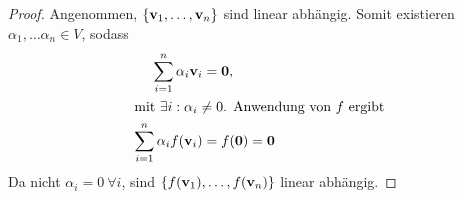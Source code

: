\documentclass{../mfa}
\begin{document}
\subsection{}

\begin{proof}
   Angenommen, $\{\mathbf{v}_{1}, \ldots, \mathbf{v}_{n}\}$ sind linear abhängig. Somit existieren
   $\alpha_1, \ldots \alpha_n \in V$, sodass
   \begin{align*}
      \sum_{i=1}^n \alpha_i \mathbf{v}_{i} &= \mathbf{0},\\
      \intertext{mit $\exists i : \alpha_i \neq 0$. Anwendung von $f$ ergibt}
      \sum_{i=1}^n \alpha_i f(\mathbf{v}_{i}) &= f(\mathbf{0}) = \mathbf{0}\\
   \end{align*}
   Da nicht $\alpha_i = 0 ~\forall i$, sind $\{f(\mathbf{v}_{1}), \ldots, f(\mathbf{v}_{n})\}$
   linear abhängig.
\end{proof}

\subsection{}
\end{document}
